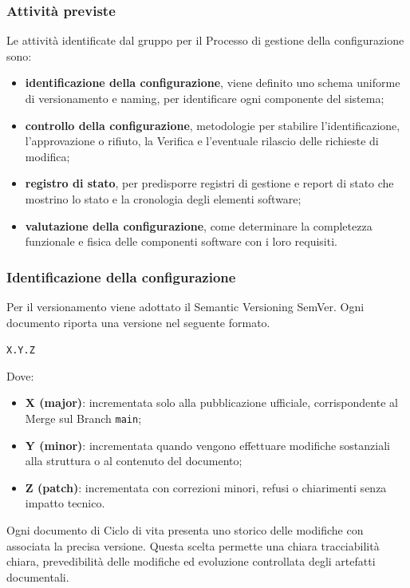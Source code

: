 \documentclass[a4paper,12pt]{article}
\begin{document}
\subsubsection{Attività previste}
Le attività identificate dal gruppo per il Processo di gestione della configurazione sono:
\begin{itemize}
    \item \textbf{identificazione della configurazione}, viene definito uno schema uniforme di versionamento e naming, per identificare ogni componente del sistema;
    \item \textbf{controllo della configurazione}, metodologie per stabilire l'identificazione, l'approvazione o rifiuto, la Verifica e l'eventuale rilascio delle richieste di modifica; 
    \item \textbf{registro di stato}, per predisporre registri di gestione e report di stato che mostrino lo stato e la cronologia degli elementi software;
    \item \textbf{valutazione della configurazione}, come determinare la completezza funzionale e fisica delle componenti software con i loro requisiti.
\end{itemize}

\subsubsection{Identificazione della configurazione}
Per il versionamento viene adottato il Semantic Versioning SemVer.  
Ogni documento riporta una versione nel seguente formato.
\begin{center}
\texttt{X.Y.Z}
\end{center}
Dove:
\begin{itemize}
    \item \textbf{X (major)}: incrementata solo alla pubblicazione ufficiale, corrispondente al Merge sul Branch \texttt{main};
    \item \textbf{Y (minor)}: incrementata quando vengono effettuare modifiche sostanziali alla struttura o al contenuto del documento;
    \item \textbf{Z (patch)}: incrementata con correzioni minori, refusi o chiarimenti senza impatto tecnico.
\end{itemize}
Ogni documento di Ciclo di vita presenta uno storico delle modifiche con associata la precisa versione.
Questa scelta permette una chiara tracciabilità chiara, prevedibilità delle modifiche ed evoluzione controllata degli artefatti documentali.
\end{document}
